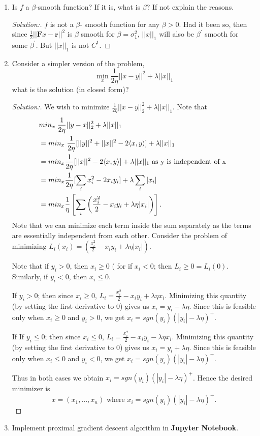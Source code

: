 \documentclass[a4paper,11pt,reqno]{amsart}
\theoremstyle{plain}
\theoremstyle{definition}
\theoremstyle{remark}
\numberwithin{equation}{section}
\begin{document}
\begin{enumerate}
\item Is $f$ a $\beta$-smooth function? If it is,  what is $\beta$? If not explain the reasons.
\begin{proof}[Solution:] $f$ is not a $\beta$- smooth function for any $\beta >0$. Had it been so, then since $\frac{1}{2}||\mathbf{F}x - \mathbf{r}||^2$ is $\beta$ smooth for $\beta = \sigma_1^2$, $||x||_1$ will also be $\beta^{'}$ smooth for some $\beta^{'}$. But $||x||_{1}$ is not $C^{1}$.
	\end{proof}
\vskip 16pt
\item Consider a simpler version of the problem,
\[
\min_x \frac{1}{2\eta}||x - y||^2 + \lambda||x||_1
\]
what is the solution (in closed form)?
\begin{proof}[Solution:] We wish to minimize $\frac{1}{2\eta}||x - y||^2_2 + \lambda ||x||_1$. Note that 
	\begin{align}
	&min_{x}\; \frac{1}{2\eta} ||y - x||^2_2 + \lambda||x||_1 \notag \\
	& = min_{x}\; \frac{1}{2\eta}[ ||y||^2 + ||x||^2 - 2 \langle x, y \rangle] + \lambda||x||_1 \notag \\
	& = min_{x} \frac{1}{2\eta}[||x||^2 - 2 \langle x, y \rangle] + \lambda||x||_1 \mbox{ as y is independent of x } \notag \\
	&=  min_{x} \frac{1}{2\eta}[ \sum_{i} x_i^2 - 2x_iy_i] + \lambda \sum_{i} |x_i| \notag \\	
	&= min_{x} \frac{1}{\eta} \left[\sum_{i} \left(\frac{x_i^2}{2} - x_iy_i + \lambda \eta |x_i|\right)\right]. 
	\end{align}
	Note that we can minimize each term inside the sum separately as the terms are essentially independent from each other. Consider the problem of minimizing 
	$L_i(x_i) = \left(\frac{x_i^2}{2} - x_iy_i + \lambda \eta |x_i|\right)$. 
	
	Note that if $y_i > 0$, then $x_i \geq 0$ ( for if $x_i <0$; then $L_i \geq 0 = L_i(0)$. Similarly, if $y_i < 0$, then $x_i \leq 0$. 
	
	If $y_i > 0$; then since $x_i \geq 0$, $L_i = \frac{x_i^2}{2} - x_iy_i + \lambda \eta x_i$. Minimizing this quantity (by setting the first derivative to $0$) gives us $x_i = y_i - \lambda \eta$. Since this is feasible only when $x_i \geq 0$ and $y_i > 0$, we get $x_i = sgn(y_i)(|y_i| - \lambda\eta)^{+}$. 
	
	If If $y_i \leq 0$; then since $x_i \leq 0$, $L_i = \frac{x_i^2}{2} - x_iy_i - \lambda \eta x_i$. Minimizing this quantity (by setting the first derivative to $0$) gives us $x_i = y_i + \lambda \eta$. Since this is feasible only when $x_i \leq 0$ and $y_i < 0$, we get $x_i = sgn(y_i)(|y_i| - \lambda\eta)^{+}$. 
	
	Thus in both cases we obtain $x_i = sgn(y_i)(|y_i| - \lambda\eta)^{+}$. Hence the desired minimizer is 
\[
x = (x_1,...,x_n) \mbox{ where }x_i = sgn(y_i)(|y_i| - \lambda\eta)^{+}.
\]
	\end{proof}
\vskip 16pt
\item Implement proximal gradient descent algorithm in \textbf{Jupyter Notebook}.
\end{enumerate}
\end{document}
